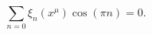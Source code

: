 \begin{equation}
  \sum_{n=0} \xi_n(x^\mu) \cos(\pi n) = 0.
\label{eq:u1-gtp-const}
\end{equation}

